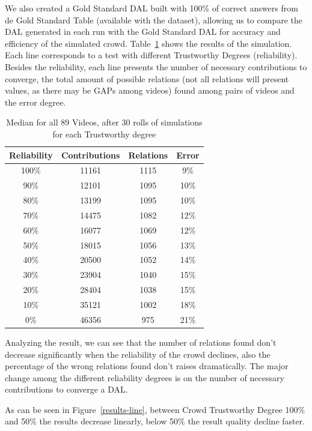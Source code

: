 We also created a Gold Standard DAL built with 100\% of correct answers from de Gold Standard Table (available with the dataset), allowing us to compare the DAL generated in each run with the Gold Standard DAL for accuracy and efficiency of the simulated crowd.  Table~\ref{xp1} shows the results of the simulation. Each line corresponds to a test with different Trustworthy Degrees (reliability).  Besides the reliability, each line presents the number of necessary contributions to converge, the total amount of possible relations (not all relations will present values, as there may be GAPs among videos) found among pairs of videos and the error degree.


\begin{table}
\begin{center}
\caption{Median for all 89 Videos, after 30 rolls of simulations for each Trustworthy degree} \label{xp1}
\begin{tabular}{|c|c|c|c|}
  \hline
  Reliability & Contributions & Relations & Error
  \\
  \hline
  100\% & 11161 & 1115 & 9\% \\
  90\%  & 12101 & 1095 & 10\% \\
  80\%  & 13199 & 1095 & 10\% \\
  70\%  & 14475 & 1082 & 12\% \\
  60\%  & 16077 & 1069 & 12\% \\
  50\%  & 18015 & 1056 & 13\% \\
  40\%  & 20500 & 1052 & 14\%\\
  30\%  & 23904 & 1040 & 15\% \\
  20\%  & 28404 & 1038 & 15\% \\
  10\%  & 35121 & 1002 & 18\% \\
  0\%   & 46356 & 975  & 21\% \\
  \hline
\end{tabular}
\end{center}
\end{table}

Analyzing the result, we can see that the number of relations found don’t decrease significantly when the reliability of the crowd declines, also the percentage of the wrong relations found don’t raises dramatically. The major change among the different reliability degrees is on the number of necessary contributions to converge a DAL.

As can be seen in Figure~\ref{results-line}, between Crowd Trustworthy Degree 100\% and 50\% the results decrease linearly, below 50\% the result quality decline faster.

